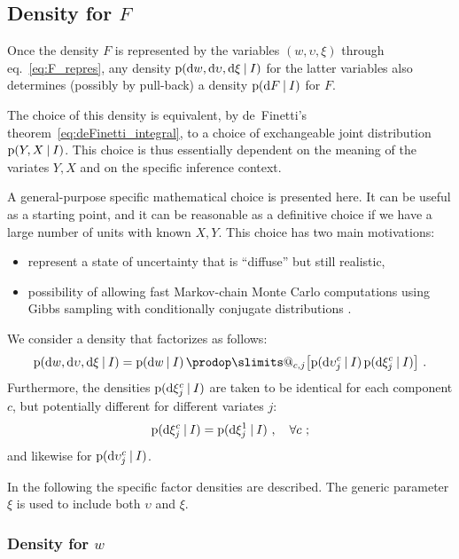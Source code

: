 \documentclass[\ifafour a4paper,12pt,\else a5paper,10pt,\fi%
onecolumn,oneside,article,%
british%
]{memoir}
\makeatletter
\theoremstyle{remark}
\theoremstyle{innote}
\def\prod{\DOTSI\prodop\slimits@}
\newcommand*{\di}{\mathrm{d}}%
\newcommand*{\p}{\mathrm{p}}%
\renewcommand*{\|}[1][]{\nonscript\:#1\vert\nonscript\:\mathopen{}}
\newcommand*{\eqn}{eq.}%
\newcommand*{\cf}{{cf.}}
\makeatother
\begin{document}
\subsection{Density for $F$}
\label{sec:density_F}

Once the density $F$ is represented by the variables $(w, \upsilon, \xi)$ through \eqn~\eqref{eq:F_repres}, any density $\p(\di w, \di\upsilon, \di\xi \|I)$ for the latter variables also determines (possibly by pull-back) a density $\p(\di F \| I)$ for $F$.

The choice of this density is equivalent, by de~Finetti's theorem~\eqref{eq:deFinetti_integral}, to a choice of exchangeable joint distribution $\p(Y, X \|I)$. This choice is thus essentially dependent on the meaning of the variates $Y,X$ and on the specific inference context.

A general-purpose specific mathematical choice is presented here. It can be useful as a starting point, and it can be reasonable as a definitive choice if we have a large number of units with known $X,Y$. %
This choice has two main motivations:
\begin{itemize}
\item represent a state of uncertainty that is \enquote{diffuse} but still realistic,
\item possibility of allowing fast Markov-chain Monte Carlo computations using Gibbs sampling with conditionally conjugate distributions \autocites[\cf][]{goerueretal2010}.
\end{itemize}

We consider a density that factorizes as follows:
\begin{equation}
  \label{eq:density_factorizes}
  \p(\di w, \di\upsilon, \di\xi \|I) =
  \p(\di w \|I)\,
  \prod_{c,j}\bigl[\p(\di\upsilon^{c}_{j} \|I)\,
  \p(\di\xi^{c}_{j} \|I) \bigr] \ .
\end{equation}
Furthermore, the densities $\p(\di\xi^{c}_{j} \|I)$ are taken to be identical for each component $c$, but potentially different for different variates $j$:
\begin{equation}
  \label{eq:density_same_c}
  \p(\di\xi^{c}_{j} \|I) = \p(\di\xi^{1}_{j} \|I) \ ,\quad\forall c \ ;
\end{equation}
and likewise for $\p(\di\upsilon^{c}_{j} \|I)$.

In the following the specific factor densities are described. The generic parameter $\xi$ is used to include both $\upsilon$ and $\xi$.

\subsubsection{Density for $w$}
\label{sec:params_w}
\end{document}
